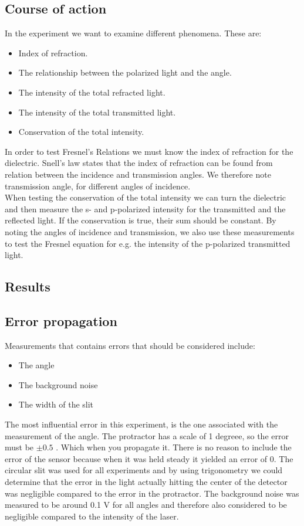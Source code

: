 \documentclass[working]{inputs/tuftebook}
\begin{document}
\subsection{Course of action}
In the experiment we want to examine different phenomena. These are:
\begin{itemize}
    \item Index of refraction.
    \item The relationship between the polarized light and the angle.
    \item The intensity of the total refracted light.
    \item The intensity of the total transmitted light.
    \item Conservation of the total intensity.
    
\end{itemize}
In order to test Fresnel's Relations we must know the index of refraction for the dielectric. Snell's law states that the index of refraction can be found from relation between the incidence and transmission angles. We therefore note transmission angle, for different angles of incidence. 
\\

When testing the conservation of the total intensity we can turn the dielectric and then measure the s- and p-polarized intensity for the transmitted and the reflected light. If the conservation is true, their sum should be constant. By noting the angles of incidence and transmission, we also use these measurements to test the Fresnel equation for e.g. the intensity of the p-polarized transmitted light. 
\subsection{Results}
\subsection{Error propagation}
Measurements that contains errors that should be considered include:
\begin{itemize}
    \item The angle 
    \item The background noise
    \item The width of the slit
\end{itemize}
 The most influential error in this experiment, is the one associated with the measurement of the angle. The protractor has a scale of 1 degreee, so the error must be $\pm 0.5$ \textdegree. Which when you propagate it. There is no reason to include the error of the sensor because when it was held steady it yielded an error of 0. The circular slit was used for all experiments and by using trigonometry we could determine that the error in the light actually hitting the center of the detector was negligible compared to the error in the protractor. The background noise was measured to be around 0.1 V for all angles and therefore also considered to be negligible compared to the intensity of the laser.
\end{document}
